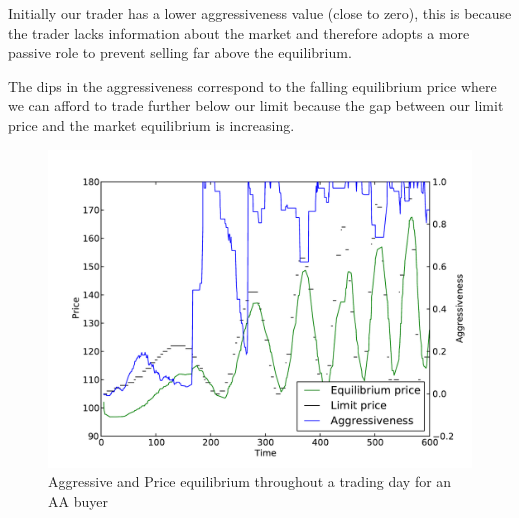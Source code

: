 \documentclass[preprint]{acm_proc_article-sp} %
\begin{document}
Initially our trader has a lower aggressiveness value (close to zero), this is
because the trader lacks information about the market and therefore adopts a
more passive role to prevent selling far above the equilibrium.

The dips in the aggressiveness correspond to the falling equilibrium price
where we can afford to trade further below our limit because the gap between
our limit price and the market equilibrium is increasing.


\begin{figure}[H] 
\centering
\includegraphics[width=\columnwidth]{graphs_and_stats/graph_aggressiveness_vs_price.pdf}
\caption{Aggressive and Price equilibrium throughout a trading day for an AA
buyer}
\label{fig:avtime}
\end{figure}
\end{document}
